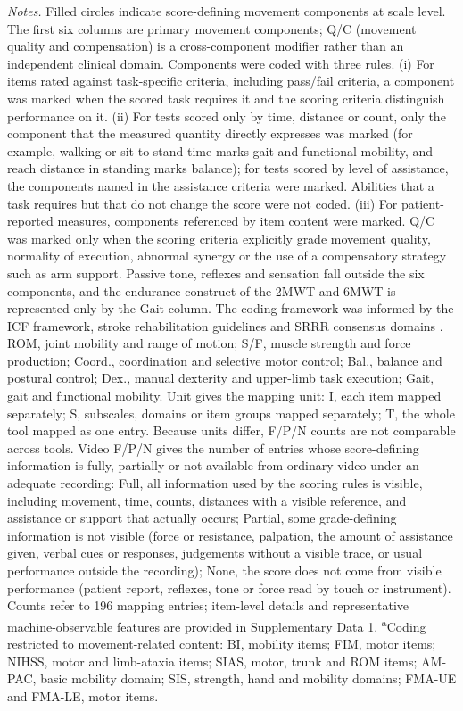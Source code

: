 \noindent\scriptsize\textit{Notes.} Filled circles indicate score-defining movement components at scale level. The first six columns are primary movement components; Q/C (movement quality and compensation) is a cross-component modifier rather than an independent clinical domain. Components were coded with three rules. (i) For items rated against task-specific criteria, including pass/fail criteria, a component was marked when the scored task requires it and the scoring criteria distinguish performance on it. (ii) For tests scored only by time, distance or count, only the component that the measured quantity directly expresses was marked (for example, walking or sit-to-stand time marks gait and functional mobility, and reach distance in standing marks balance); for tests scored by level of assistance, the components named in the assistance criteria were marked. Abilities that a task requires but that do not change the score were not coded. (iii) For patient-reported measures, components referenced by item content were marked. Q/C was marked only when the scoring criteria explicitly grade movement quality, normality of execution, abnormal synergy or the use of a compensatory strategy such as arm support. Passive tone, reflexes and sensation fall outside the six components, and the endurance construct of the 2MWT and 6MWT is represented only by the Gait column. The coding framework was informed by the ICF framework, stroke rehabilitation guidelines and SRRR consensus domains \cite{WHO2001ICF,S1Winstein2016AHAASARehab,S1VADoD2024StrokeRehab,S1NICE2023NG236,CoreKwakkel2017SRRRSensorimotor,CoreKwakkel2019SRRRUpperLimb,CoreVanCriekinge2024SRRRBalanceMobility}. ROM, joint mobility and range of motion; S/F, muscle strength and force production; Coord., coordination and selective motor control; Bal., balance and postural control; Dex., manual dexterity and upper-limb task execution; Gait, gait and functional mobility. Unit gives the mapping unit: I, each item mapped separately; S, subscales, domains or item groups mapped separately; T, the whole tool mapped as one entry. Because units differ, F/P/N counts are not comparable across tools. Video F/P/N gives the number of entries whose score-defining information is fully, partially or not available from ordinary video under an adequate recording: Full, all information used by the scoring rules is visible, including movement, time, counts, distances with a visible reference, and assistance or support that actually occurs; Partial, some grade-defining information is not visible (force or resistance, palpation, the amount of assistance given, verbal cues or responses, judgements without a visible trace, or usual performance outside the recording); None, the score does not come from visible performance (patient report, reflexes, tone or force read by touch or instrument). Counts refer to 196 mapping entries; item-level details and representative machine-observable features are provided in Supplementary Data 1. \textsuperscript{a}Coding restricted to movement-related content: BI, mobility items; FIM, motor items; NIHSS, motor and limb-ataxia items; SIAS, motor, trunk and ROM items; AM-PAC, basic mobility domain; SIS, strength, hand and mobility domains; FMA-UE and FMA-LE, motor items.
\endgroup

